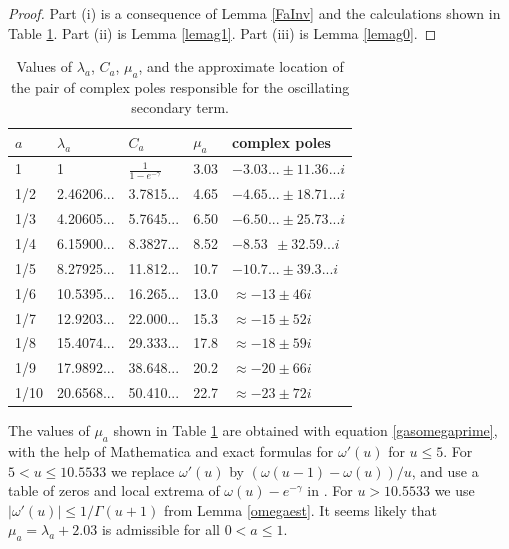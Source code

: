 \documentclass[11pt]{amsart}
\begin{document}
\begin{proof}
Part (i) is a consequence of Lemma \ref{FaInv} and the calculations shown in Table \ref{table1}.
Part (ii) is Lemma \ref{lemag1}.
Part (iii) is Lemma \ref{lemag0}.
\end{proof}

\begin{table}[h]
  \begin{tabular}{ | l | l | l | l | l |}
   \hline
    $a$ & $\lambda_a$ & $C_a$ & $\mu_a$ & complex poles \\ \hline
    1 & 1  & $\frac{1}{1-e^{-\gamma}}$ & 3.03 & $-3.03... \pm 11.36... i$ \\ \hline
1/2 & 2.46206... & 3.7815...  & 4.65 & $-4.65... \pm 18.71... i$ \\ \hline
1/3 & 4.20605... & 5.7645... & 6.50  & $-6.50... \pm 25.73... i$ \\ \hline
1/4 & 6.15900... & 8.3827... & 8.52   & $-8.53\ \ \pm 32.59... i$\\ \hline
1/5 & 8.27925... & 11.812... & 10.7  & $-10.7... \pm 39.3... i$ \\ \hline
1/6 & 10.5395... & 16.265... & 13.0 & $\approx -13 \pm 46 i$ \\ \hline
1/7 & 12.9203... &  22.000... & 15.3  & $\approx -15 \pm 52 i$ \\ \hline
1/8 & 15.4074... &  29.333... & 17.8  & $\approx -18 \pm 59 i$ \\ \hline
1/9 & 17.9892... &  38.648... &  20.2  & $\approx -20 \pm 66 i$ \\ \hline
1/10 & 20.6568... & 50.410... &  22.7  & $\approx -23\pm 72i$ \\ \hline
    \end{tabular}
  \caption{Values of $\lambda_a$,  $C_a$, $\mu_a$, and the approximate location of the pair of complex poles responsible for the oscillating secondary term.}
  \label{table1}
  \end{table}



The values of $\mu_a$ shown in Table \ref{table1}  are obtained with equation 
\eqref{gasomegaprime}, with the help of Mathematica and exact formulas for $\omega'(u)$ for $u\le 5$.
For $5<u\le 10.5533$ we replace $\omega'(u)$ by $(\omega(u-1)-\omega(u))/u$, 
and use a table of zeros and local extrema of $\omega(u)-e^{-\gamma}$ in \cite{CherGold}.
For $u>10.5533$ we use $|\omega'(u)|\le 1/\Gamma(u+1)$ from Lemma \ref{omegaest}.
It seems likely that $\mu_a = \lambda_a+2.03$ is admissible for all $0<a\le 1$. 
\end{document}
